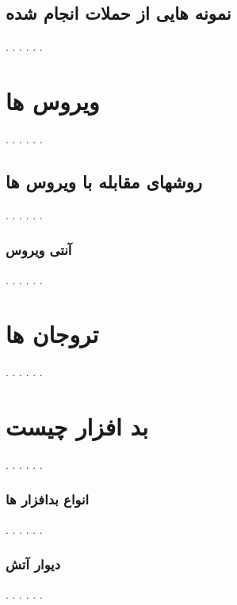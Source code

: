 \documentclass[12pt]{book}
\begin{document}
\subsection{نمونه هایی از حملات انجام شده}
. . . . . .
\section{ویروس ها}
. . . . . .
\subsection{روشهای مقابله با ویروس ها}
. . . . . .
\subsubsection{آنتی ویروس}
. . . . . .
\section{تروجان ها}
. . . . . .
\section{بد افزار چیست}
. . . . . .
\subsubsection{انواع بدافزار ها}
. . . . . .
\subsubsection{دیوار آتش}
. . . . . .
\end{document}
